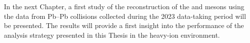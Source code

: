 In the next Chapter, a first study of the reconstruction of the \ds and \dpl mesons using the data from Pb--Pb collisions collected during the 2023 data-taking period will be presented. The results will provide a first insight into the performance of the analysis strategy presented in this Thesis in the heavy-ion environment.



